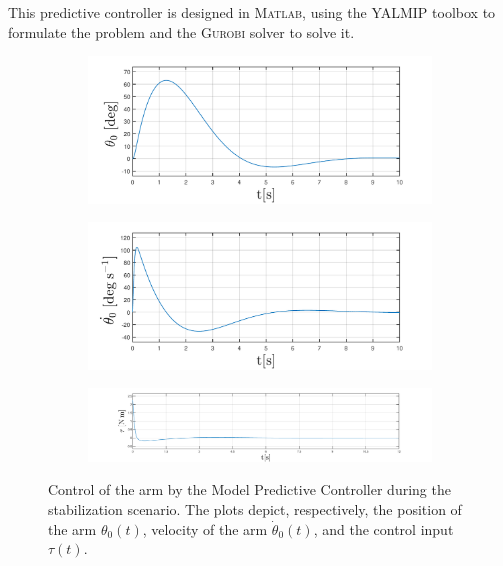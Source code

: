 This predictive controller is designed in \textsc{Matlab}, using the \textsc{YALMIP} toolbox \cite{YALMIP} to formulate the problem and the \textsc{Gurobi} solver to solve it.
\newpage
\begin{figure}[H]
	\centering
	\begin{subfigure}
		\centering
		\includegraphics[scale=0.6]{images/MPC/arm.pdf}  
	\end{subfigure}
	\begin{subfigure}
		\centering
		\includegraphics[scale=0.6]{images/MPC/darm.pdf}  
	\end{subfigure}
	\begin{subfigure}
		\centering
		\includegraphics[scale=0.6]{images/MPC/control.pdf}  
	\end{subfigure}
	\caption{Control of the arm by the Model Predictive Controller during the stabilization scenario. The plots depict, respectively, the position of the arm $\theta_0(t)$, velocity of the arm $\dot{\theta}_0(t)$, and the control input $\tau(t)$.}
	\label{mpc}
\end{figure}
